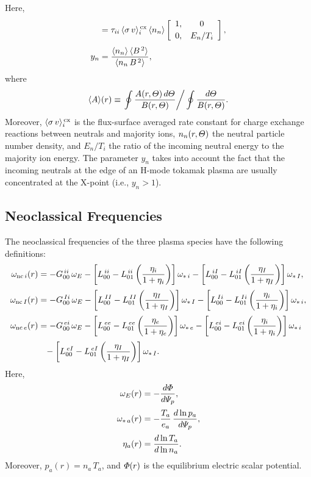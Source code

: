 \documentclass[notitlepage,12pt]{article}
\begin{document}
Here,
\begin{align}
[Y^{\,in}] &= \tau_{ii}\,\langle \sigma\,v\rangle_i^{\,\rm cx}
\,\langle n_n\rangle\left[
\begin{array}{cc} 1,& 0\\[0.5ex]0,&E_n/T_i\end{array}
\right],\\[0.5ex]
y_n &= \frac{\langle n_n\rangle\,\langle B^{\,2}\rangle}{\langle
n_n\,B^{\,2}\rangle},
\end{align}
where
\begin{equation}
\langle A\rangle (r) \equiv\left.\oint \frac{A(r,{\mit\Theta})\,d{\mit\Theta}}{B(r,{\mit\Theta})}\right/\oint \frac{d{\mit\Theta}}{B(r,{\mit\Theta})}.
\end{equation}
Moreover, $\langle \sigma\,v\rangle_i^{\,\rm cx}$ is the flux-surface
averaged rate constant for charge exchange reactions between neutrals and majority ions, $n_n(r,{\mit\Theta})$  the
neutral particle number density, and $E_n/T_i$ the ratio of the incoming neutral energy to the majority ion energy. The parameter
$y_n$ takes into account the fact that the incoming neutrals at the
edge of an H-mode tokamak plasma are usually
concentrated at the X-point (i.e., $y_n>1$).

\subsection{Neoclassical Frequencies}
The neoclassical frequencies of the three plasma species have the following definitions:
\begin{align}
\omega_{{\rm nc}\,i}(r)&=-G_{00}^{\,ii}\,\omega_E -\left[L^{\,ii}_{00}-L^{\,ii}_{01}\left(\frac{\eta_i}{1+\eta_i}\right)\right]\omega_{\ast\,i}-
\left[L^{\,iI}_{00}-L^{\,iI}_{01}\left(\frac{\eta_I}{1+\eta_I}\right)\right]\omega_{\ast\,I},\\[0.5ex]
\omega_{{\rm nc}\,I}(r)&=-G_{00}^{\,Ii}\,\omega_E -\left[L^{\,II}_{00}-L^{\,II}_{01}\left(\frac{\eta_I}{1+\eta_I}\right)\right]\omega_{\ast\,I}-
\left[L^{\,Ii}_{00}-L^{\,Ii}_{01}\left(\frac{\eta_i}{1+\eta_i}\right)\right]\omega_{\ast\,i},\\[0.5ex]
\omega_{{\rm nc}\,e}(r)&=-G_{00}^{\,ei}\,\omega_E -\left[L^{\,ee}_{00}-L^{\,ee}_{01}\left(\frac{\eta_e}{1+\eta_e}\right)\right]\omega_{\ast\,e}-
\left[L^{\,ei}_{00}-L^{\,ei}_{01}\left(\frac{\eta_i}{1+\eta_i}\right)\right]\omega_{\ast\,i}\nonumber\\[0.5ex]
&\phantom{=}-
\left[L^{\,eI}_{00}-L^{\,eI}_{01}\left(\frac{\eta_I}{1+\eta_I}\right)\right]\omega_{\ast\,I}.
\end{align}
Here,
\begin{align}
\omega_E(r) &=-\frac{d{\mit\Phi}}{d{\mit\Psi}_p},\\[0.5ex]
\omega_{\ast\,a}(r) &= -\frac{T_a}{e_a}\,\frac{d\ln p_a}{d{\mit\Psi}_p},\\[0.5ex]
\eta_a(r) &= \frac{d\ln T_a}{d\ln n_a}.
\end{align}
Moreover, $p_a(r)=n_a\,T_a$, and ${\mit\Phi}(r)$ is the equilibrium electric scalar potential. 
\end{document}
